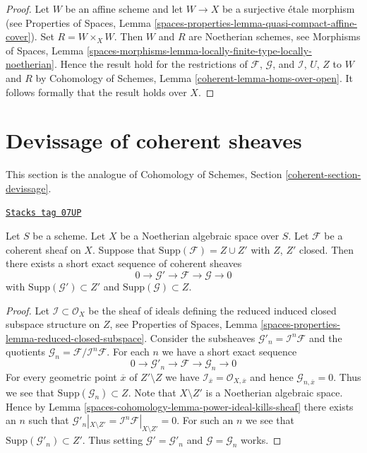 \begin{proof}
Let $W$ be an affine scheme and let $W \to X$ be a surjective \'etale
morphism (see Properties of Spaces, Lemma
\ref{spaces-properties-lemma-quasi-compact-affine-cover}).
Set $R = W \times_X W$. Then $W$ and $R$ are Noetherian schemes, see
Morphisms of Spaces, Lemma
\ref{spaces-morphisms-lemma-locally-finite-type-locally-noetherian}.
Hence the result hold for the restrictions of $\mathcal{F}$, $\mathcal{G}$,
and $\mathcal{I}$, $U$, $Z$ to $W$ and $R$ by
Cohomology of Schemes, Lemma \ref{coherent-lemma-homs-over-open}.
It follows formally that the result holds over $X$.
\end{proof}

\section{Devissage of coherent sheaves}
\label{spaces-cohomology-section-devissage}
This section is the analogue of
Cohomology of Schemes, Section \ref{coherent-section-devissage}.

\begin{lemma}
\label{spaces-cohomology-lemma-prepare-filter-support}
\href{https://stacks.math.columbia.edu/tag/07UP}{\texttt{Stacks tag 07UP}}

Let $S$ be a scheme. Let $X$ be a Noetherian algebraic space over $S$.
Let $\mathcal{F}$ be a coherent sheaf on $X$. Suppose that
$\text{Supp}(\mathcal{F}) = Z \cup Z'$ with $Z$, $Z'$ closed.
Then there exists a short exact sequence of coherent sheaves
$$
0 \to \mathcal{G}' \to \mathcal{F} \to \mathcal{G} \to 0
$$
with $\text{Supp}(\mathcal{G}') \subset Z'$ and
$\text{Supp}(\mathcal{G}) \subset Z$.
\end{lemma}

\begin{proof}
Let $\mathcal{I} \subset \mathcal{O}_X$ be the sheaf of ideals
defining the reduced induced closed subspace structure on $Z$, see
Properties of Spaces, Lemma
\ref{spaces-properties-lemma-reduced-closed-subspace}.
Consider the subsheaves
$\mathcal{G}'_n = \mathcal{I}^n\mathcal{F}$ and the
quotients $\mathcal{G}_n = \mathcal{F}/\mathcal{I}^n\mathcal{F}$.
For each $n$ we have a short exact sequence
$$
0 \to \mathcal{G}'_n \to \mathcal{F} \to \mathcal{G}_n \to 0
$$
For every geometric point $\overline{x}$ of $Z' \setminus Z$ we have
$\mathcal{I}_{\overline{x}} = \mathcal{O}_{X, \overline{x}}$
and hence $\mathcal{G}_{n, \overline{x}} = 0$. Thus we see that
$\text{Supp}(\mathcal{G}_n) \subset Z$. Note that $X \setminus Z'$
is a Noetherian algebraic space. Hence by
Lemma \ref{spaces-cohomology-lemma-power-ideal-kills-sheaf}
there exists an $n$ such that $\mathcal{G}'_n|_{X \setminus Z'} =
\mathcal{I}^n\mathcal{F}|_{X \setminus Z'} = 0$.
For such an $n$ we see that $\text{Supp}(\mathcal{G}'_n) \subset Z'$.
Thus setting $\mathcal{G}' = \mathcal{G}'_n$ and $\mathcal{G} = \mathcal{G}_n$
works.
\end{proof}

